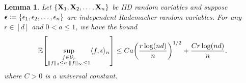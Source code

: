 \documentclass[11pt]{article}
\theoremstyle{plain}
\newtheorem{lemma}[theorem]{Lemma}
\theoremstyle{definition}
\theoremstyle{remark}
\theoremstyle{plain}
\newcommand{\bX}{\mathbf{X}}
\DeclarePairedDelimiter{\braces}{\lbrace}{\rbrace}
\DeclarePairedDelimiter{\bracks}{[}{]}
\DeclarePairedDelimiter{\paren}{(}{)}
\DeclarePairedDelimiter{\norm}{\|}{\|}
\DeclarePairedDelimiter{\inprod}{\langle}{\rangle}
\newcommand{\E}{\mathbb{E}}
\newcommand{\partfunc}{\mathcal{V}}
\newcommand{\1}{\mathbbm{1}}
\begin{document}
\begin{lemma}
\label{lem:subG_multiplier_sup_exp}
    Let $\braces*{\bX_1,\bX_2,\ldots,\bX_n}$ be IID random variables and suppose $\boldsymbol{\epsilon} \coloneqq \braces{\epsilon_1,\epsilon_2,\ldots,\epsilon_n}$ are independent Rademacher random variables.
    For any $r\in[d]$ and $0 < a \leq 1$,
    we have the bound
    \begin{equation} \label{eq:subG_multiplier_sup_exp}
        \E\bracks*{\sup_{\substack{f \in \partfunc_r \\
        \norm{f}_2 \leq a,\norm{f}_\infty \leq 1}} \inprod{f,\epsilon}_n} \leq Ca\paren*{\frac{r\log(nd)}{n}}^{1/2} + \frac{Cr\log(nd)}{n}.
    \end{equation}
    where $C > 0$ is a universal constant.
\end{lemma}
\end{document}
